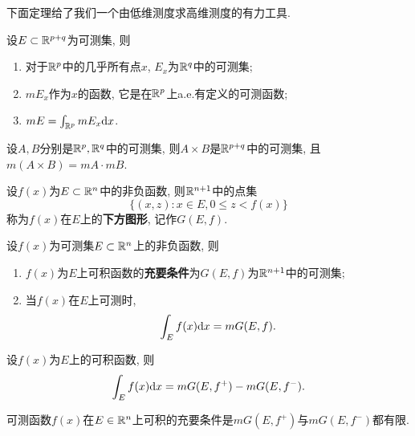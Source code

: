 \vskip 0.4cm
下面定理给了我们一个由低维测度求高维测度的有力工具.

\begin{theorem}[截面定理]\label{thm:cross-section}
	设$E \subset \mathbb{R}^{p+q}$为可测集, 则
	\begin{enumerate}
		\item 对于$\mathbb{R}^p$中的几乎所有点$x$, $E_x$为$\mathbb{R}^q$中的可测集; 
		\item $m E_x$作为$x$的函数, 它是在$\mathbb{R}^p$上a.e.有定义的可测函数;
		\item $m E = \int_{\mathbb{R}^p} m E_x \mathrm{d} x$. 
	\end{enumerate}
\end{theorem}

\vskip 0.2cm
\begin{theorem}
	设$A,B$分别是$\mathbb{R}^p,\mathbb{R}^q$中的可测集, 则$A \times B$是$\mathbb{R}^{p+q}$中的可测集, 且$m (A \times B) = mA \cdot mB$. 	
\end{theorem}

\vskip 0.4cm
\begin{definition}[下方图形]
	设$f(x)$为$E \subset \mathbb{R}^n$中的非负函数, 则$\mathbb{R}^{n+1}$中的点集
	$$
		\{ (x,z): x \in E, 0 \leq z < f(x) \}
	$$
	称为$f(x)$在$E$上的\textbf{下方图形}, 记作$G(E,f)$.
\end{definition}

\vskip 0.2cm
\begin{theorem}[非负可测函数积分的几何意义]\label{thm:Geo-meaning}
	设$f (x)$为可测集$E \subset \mathbb{R}^n$上的非负函数, 则
	\begin{enumerate}
		\item $f(x)$为$E$上可积函数的\textbf{充要条件}为$G(E,f)$为$\mathbb{R}^{n+1}$中的可测集; 
		\item 当$f(x)$在$E$上可测时, 
		$$
			\int_E f(x) \mathrm{d} x = m G(E,f). 
		$$
	\end{enumerate}
\end{theorem}

\vskip 0.2cm
\begin{corollary}
	设$f (x)$为$E$上的可积函数, 则
	$$
		\int_E f(x) \mathrm{d} x = m G(E, f^+) - m G(E,f^-). 
	$$
\end{corollary}

\vskip 0.2cm
\begin{corollary}
	可测函数$f(x)$在$E \in \mathbb{R}^n$上可积的充要条件是$m G(E, f^+)$与$m G(E,f^-)$都有限.
\end{corollary}

